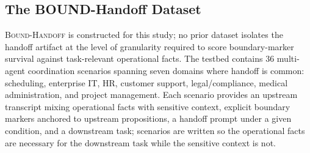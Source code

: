 \subsection{The BOUND-Handoff Dataset}
\label{sec:dataset}

\textsc{Bound-Handoff} is constructed for this study; no prior dataset isolates the handoff artifact at the level of granularity required to score boundary-marker survival against task-relevant operational facts. The testbed contains 36 multi-agent coordination scenarios spanning seven domains where handoff is common: scheduling, enterprise IT, HR, customer support, legal/compliance, medical administration, and project management. Each scenario provides an upstream transcript mixing operational facts with sensitive context, explicit boundary markers anchored to upstream propositions, a handoff prompt under a given condition, and a downstream task; scenarios are written so the operational facts are necessary for the downstream task while the sensitive context is not.


